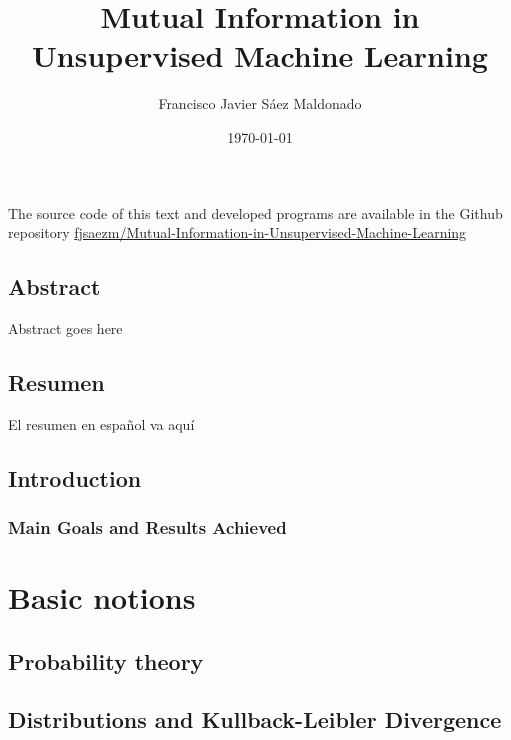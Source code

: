 \documentclass[oneside,openright,titlepage,numbers=noenddot,openany,headinclude,footinclude=true, cleardoublepage=empty,abstractoff,BCOR=5mm,paper=a4,fontsize=11pt, dvipsnames]{scrreprt}
\author{Francisco Javier Sáez Maldonado}
\date{\today}
\title{Mutual Information in Unsupervised Machine Learning}
\begin{document}
\maketitle


\vspace*{\fill}
\doclicenseThis
The source code of this text and developed programs are available in the Github repository \href{https://github.com/fjsaezm/Mutual-Information-in-Unsupervised-Machine-Learning}{fjsaezm/Mutual-Information-in-Unsupervised-Machine-Learning}

\chapter*{Abstract}
Abstract goes here
\chapter*{Resumen}
El resumen en español va aquí
\chapter*{Introduction}
\section*{Main Goals and Results Achieved}
\newpage


\tableofcontents
\newpage
\listoffigures
\listoftables

\newpage

\part{Basic notions}

\chapter{Probability theory}

\clearpage
\chapter{Distributions and Kullback-Leibler Divergence}

\clearpage
\end{document}
